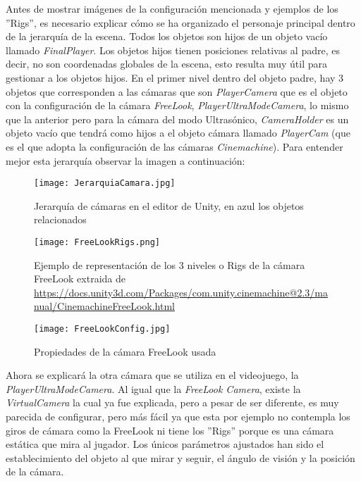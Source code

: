 Antes de mostrar imágenes de la configuración mencionada y ejemplos de los ''Rigs'', es necesario explicar cómo se ha organizado el personaje principal dentro de la jerarquía de la escena. Todos los objetos son hijos de un objeto vacío llamado \textit{FinalPlayer}. Los objetos hijos tienen posiciones relativas al padre, es decir, no son coordenadas globales de la escena, esto resulta muy útil para gestionar a los objetos hijos. En el primer nivel dentro del objeto padre, hay 3 objetos que corresponden a las cámaras que son \textit{PlayerCamera} que es el objeto con la configuración de la cámara \textit{FreeLook}, \textit{PlayerUltraModeCamera}, lo mismo que la anterior pero para la cámara del modo Ultrasónico, \textit{CameraHolder} es un objeto vacío que tendrá como hijos a el objeto cámara llamado \textit{PlayerCam} (que es el que adopta la configuración de las cámaras \textit{Cinemachine}). Para entender mejor esta jerarquía observar la imagen a continuación: 

\begin{figure}[H]
    \centering
    \texttt{[image: JerarquiaCamara.jpg]}
    \caption{Jerarquía de cámaras en el editor de Unity, en azul los objetos relacionados}
\end{figure}

\begin{figure}[H]
    \centering
    \texttt{[image: FreeLookRigs.png]}
    \caption{Ejemplo de representación de los 3 niveles o Rigs de la cámara FreeLook extraida de \url{https://docs.unity3d.com/Packages/com.unity.cinemachine@2.3/manual/CinemachineFreeLook.html}}
\end{figure}

\begin{figure}[H]
    \centering
    \texttt{[image: FreeLookConfig.jpg]}
    \caption{Propiedades de la cámara FreeLook usada}
\end{figure}

Ahora se explicará la otra cámara que se utiliza en el videojuego, la \textit{PlayerUltraModeCamera}. Al igual que la \textit{FreeLook Camera}, existe la \textit{VirtualCamera} la cual ya fue explicada, pero a pesar de ser diferente, es muy parecida de configurar, pero más fácil ya que esta por ejemplo no contempla los giros de cámara como la FreeLook ni tiene los ''Rigs'' porque es una cámara estática que mira al jugador. Los únicos parámetros ajustados han sido el establecimiento del objeto al que mirar y seguir, el ángulo de visión y la posición de la cámara. 

